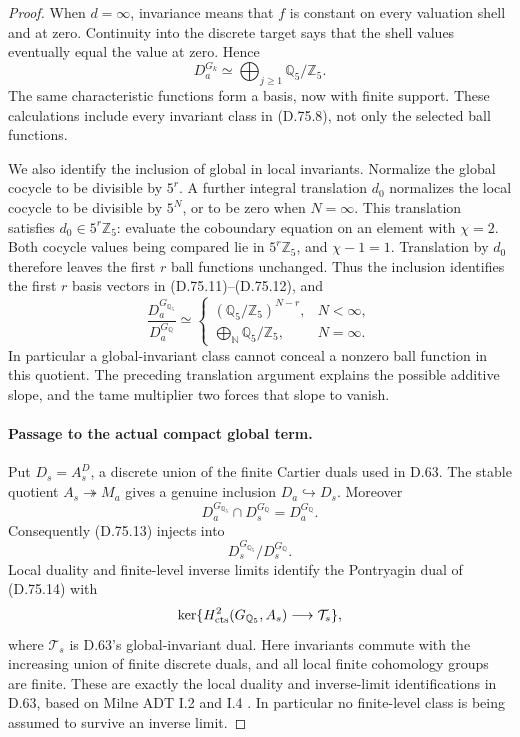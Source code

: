 \begin{proof}
When \(d=\infty\), invariance means that \(f\) is constant
on every valuation shell and at zero. Continuity into the
discrete target says that the shell values eventually equal
the value at zero. Hence
\[
 D_a^{G_k}\simeq
                   \bigoplus_{j\ge1}\mathbb Q_5/\mathbb Z_5.
                                                               \tag{D.75.12}
\]
The same characteristic functions form a basis, now with
finite support. These calculations include every invariant
class in (D.75.8), not only the selected ball functions.

We also identify the inclusion of global in local invariants.
Normalize the global cocycle to be divisible by \(5^r\).
A further integral translation \(d_0\) normalizes the local
cocycle to be divisible by \(5^N\), or to be zero when
\(N=\infty\). This translation satisfies \(d_0\in5^r\mathbb Z_5\):
evaluate the coboundary equation on an element with
\(\chi=2\). Both cocycle values being compared lie in
\(5^r\mathbb Z_5\), and \(\chi-1=1\).
Translation by \(d_0\) therefore leaves the first \(r\)
ball functions unchanged. Thus the inclusion identifies
the first \(r\) basis vectors in (D.75.11)--(D.75.12), and
\[
 \frac{D_a^{G_{\mathbb Q_5}}}{D_a^{G_{\mathbb Q}}}
 \simeq
 \begin{cases}
       (\mathbb Q_5/\mathbb Z_5)^{N-r},&N<\infty,\\
       \displaystyle\bigoplus_{\mathbb N}\mathbb Q_5/\mathbb Z_5,
                                                    &N=\infty .
 \end{cases}                                               \tag{D.75.13}
\]
In particular a global-invariant class cannot conceal a
nonzero ball function in this quotient. The preceding
translation argument explains the possible additive slope,
and the tame multiplier two forces that slope to vanish.

\paragraph{Passage to the actual compact global term.}
Put \(D_s=A_s^D\), a discrete union of the finite Cartier
duals used in D.63. The stable quotient \(A_s\twoheadrightarrow M_a\)
gives a genuine inclusion \(D_a\hookrightarrow D_s\).
Moreover
\[
 D_a^{G_{\mathbb Q_5}}\cap D_s^{G_{\mathbb Q}}
                         =D_a^{G_{\mathbb Q}}.
 \]
Consequently (D.75.13) injects into
\[
                      D_s^{G_{\mathbb Q_5}}/D_s^{G_{\mathbb Q}}.
                                                               \tag{D.75.14}
\]
Local duality and finite-level inverse limits identify the
Pontryagin dual of (D.75.14) with
\[
 \ker\{H^2_{\rm cts}(G_{\mathbb Q_5},A_s)
                      \longrightarrow\mathcal T_s\},
 \]
where \(\mathcal T_s\) is D.63's global-invariant dual.
Here invariants commute with the increasing union of finite
discrete duals, and all local finite cohomology groups are
finite. These are exactly the local duality and inverse-limit
identifications in D.63, based on Milne ADT I.2 and I.4
\cite{DE_MilneADT}. In particular no finite-level class
is being assumed to survive an inverse limit.


\end{proof}
